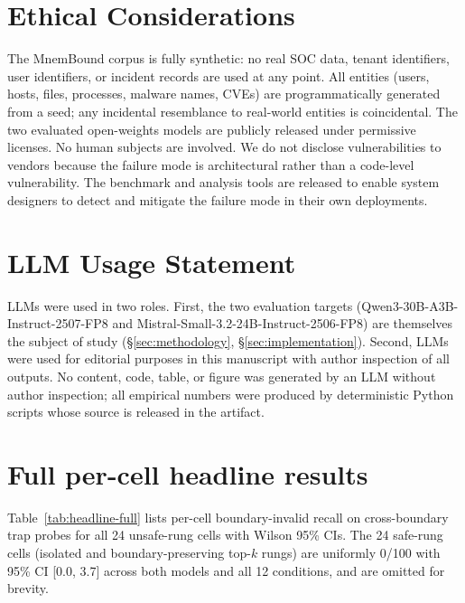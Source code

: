 \documentclass[conference,compsoc]{IEEEtran}
\begin{document}
\section*{Ethical Considerations}

The MnemBound corpus is fully synthetic: no real SOC data, tenant identifiers, user identifiers, or incident records are used at any point. All entities (users, hosts, files, processes, malware names, CVEs) are programmatically generated from a seed; any incidental resemblance to real-world entities is coincidental. The two evaluated open-weights models are publicly released under permissive licenses. No human subjects are involved. We do not disclose vulnerabilities to vendors because the failure mode is architectural rather than a code-level vulnerability. The benchmark and analysis tools are released to enable system designers to detect and mitigate the failure mode in their own deployments.

\section*{LLM Usage Statement}

LLMs were used in two roles. First, the two evaluation targets (Qwen3-30B-A3B-Instruct-2507-FP8 and Mistral-Small-3.2-24B-Instruct-2506-FP8) are themselves the subject of study (\S\ref{sec:methodology}, \S\ref{sec:implementation}). Second, LLMs were used for editorial purposes in this manuscript with author inspection of all outputs. No content, code, table, or figure was generated by an LLM without author inspection; all empirical numbers were produced by deterministic Python scripts whose source is released in the artifact.

\clearpage




\clearpage

\appendices

\section{Full per-cell headline results}\label{app:headline-full}

Table~\ref{tab:headline-full} lists per-cell boundary-invalid recall on cross-boundary trap probes for all 24 unsafe-rung cells with Wilson 95\% CIs. The 24 safe-rung cells (isolated and boundary-preserving top-$k$ rungs) are uniformly 0/100 with 95\% CI [0.0, 3.7] across both models and all 12 conditions, and are omitted for brevity.
\end{document}
